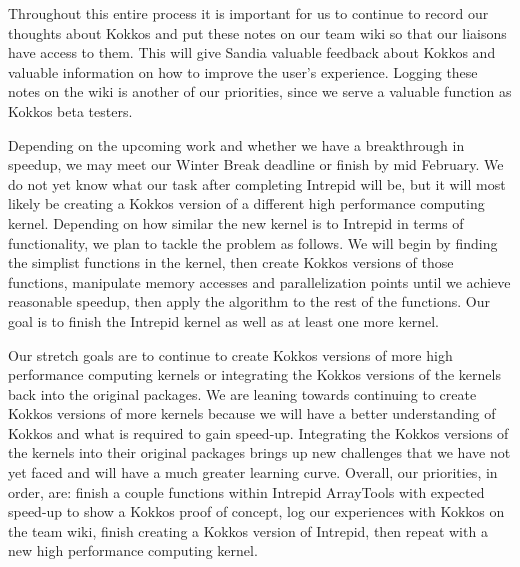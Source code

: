 \documentclass{hmcclinic}
\begin{document}
Throughout this entire process it is important for  us to continue to record our thoughts about Kokkos
and put these notes on our team wiki so that our liaisons have access to them. 
This will give Sandia valuable feedback about Kokkos and valuable information on how to improve the
user's experience. Logging these notes on the wiki is another of our priorities, since we 
serve a valuable function as Kokkos beta testers. 

Depending on the upcoming work and whether we have a breakthrough in speedup, we may meet our 
Winter Break deadline or finish by mid February. We do not yet know what our task after completing
Intrepid will be, but it will most likely be creating a Kokkos version of a different high 
performance computing kernel. Depending on how similar the new kernel is to Intrepid in terms of
functionality, we plan to tackle the problem as follows. We will begin by finding the
simplist functions in the kernel, then create Kokkos versions of those functions, manipulate memory accesses and 
parallelization points until we achieve reasonable speedup, then apply the algorithm to the rest 
of the functions. Our goal is to finish the Intrepid kernel as well as
at least one more kernel. 

Our stretch goals are to continue to create Kokkos versions of more high
performance computing kernels or integrating the Kokkos versions of the kernels back into the 
original packages. We are leaning towards continuing to create Kokkos versions of more kernels 
because we will have a better understanding of Kokkos and what is required to gain speed-up. 
Integrating the Kokkos versions of the kernels into their original packages brings up new 
challenges that we have not yet faced and will have a much greater learning curve. Overall, our 
priorities, in order, are: finish a couple functions within Intrepid ArrayTools with expected 
speed-up to show a Kokkos proof of concept, log our experiences with Kokkos on the team wiki, 
finish creating a Kokkos version of Intrepid, then repeat with a new high performance computing kernel.
\end{document}
